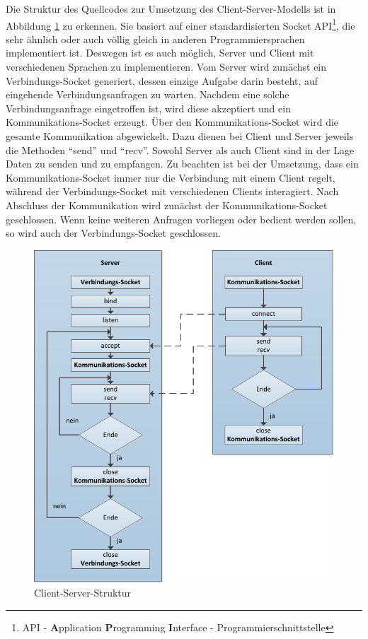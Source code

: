 \documentclass[12pt,a4paper]{report}
\begin{document}
Die Struktur des Quellcodes zur Umsetzung des Client-Server-Modells ist in Abbildung \ref{pic:Client-Server-Struktur} zu erkennen. Sie basiert auf einer standardisierten Socket API\footnote{API - \textbf{A}pplication \textbf{P}rogramming \textbf{I}nterface - Programmierschnittstelle}, die sehr ähnlich oder auch völlig gleich in anderen Programmiersprachen implementiert ist. Deswegen ist es auch möglich, Server und Client mit verschiedenen Sprachen zu implementieren. Vom Server wird zunächst ein Verbindungs-Socket generiert, dessen einzige Aufgabe darin besteht, auf eingehende Verbindungsanfragen zu warten. Nachdem eine solche Verbindungsanfrage eingetroffen ist, wird diese akzeptiert und ein Kommunikations-Socket erzeugt. Über den Kommunikations-Socket wird die gesamte Kommunikation abgewickelt. Dazu dienen bei Client und Server jeweils die Methoden "`send"' und "`recv"'. Sowohl Server als auch Client sind in der Lage Daten zu senden und zu empfangen. Zu beachten ist bei der Umsetzung, dass ein Kommunikations-Socket immer nur die Verbindung mit einem Client regelt, während der Verbindungs-Socket mit verschiedenen Clients interagiert. Nach Abschluss der Kommunikation wird zunächst der Kommunikations-Socket geschlossen. Wenn keine weiteren Anfragen vorliegen oder bedient werden sollen, so wird auch der Verbindungs-Socket geschlossen.
\begin{figure}[H]
\begin{center}
\includegraphics{Darstellungen/client-server-neu}
\caption{Client-Server-Struktur \cite{GalileoPython}}\label{pic:Client-Server-Struktur}
\end{center}
\end{figure}
\end{document}
